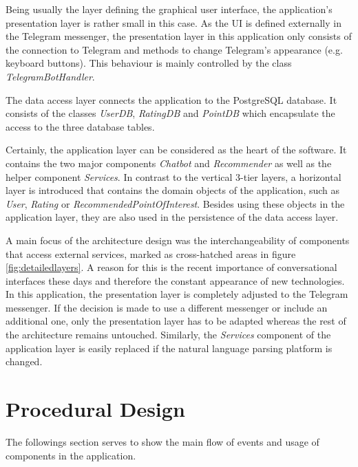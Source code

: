 Being usually the layer defining the graphical user interface, the application’s presentation layer is rather small in this case. As the UI is defined externally in the Telegram messenger, the presentation layer in this application only consists of the connection to Telegram and methods to change Telegram’s appearance (e.g. keyboard buttons). This behaviour is mainly controlled by the class \textit{TelegramBotHandler}.

The data access layer connects the application to the PostgreSQL database. It consists of the classes \textit{UserDB}, \textit{RatingDB} and \textit{PointDB} which encapsulate the access to the three database tables.

Certainly, the application layer can be considered as the heart of the software. It contains the two major components \textit{Chatbot} and \textit{Recommender} as well as the helper component \textit{Services}. In contrast to the vertical 3-tier layers, a horizontal layer is introduced that contains the domain objects of the application, such as \textit{User}, \textit{Rating} or \textit{RecommendedPointOfInterest}. Besides using these objects in the application layer, they are also used in the persistence of the data access layer.

A main focus of the architecture design was the interchangeability of components that access external services, marked as cross-hatched areas in figure \ref{fig:detailedlayers}. A reason for this is the recent importance of conversational interfaces these days and therefore the constant appearance of new technologies. In this application, the presentation layer is completely adjusted to the Telegram messenger. If the decision is made to use a different messenger or include an additional one, only the presentation layer has to be adapted whereas the rest of the architecture remains untouched. Similarly, the \textit{Services} component of the application layer is easily replaced if the natural language parsing platform is changed. 

\section{Procedural Design}
The followings section serves to show the main flow of events and usage of components in the application. 

